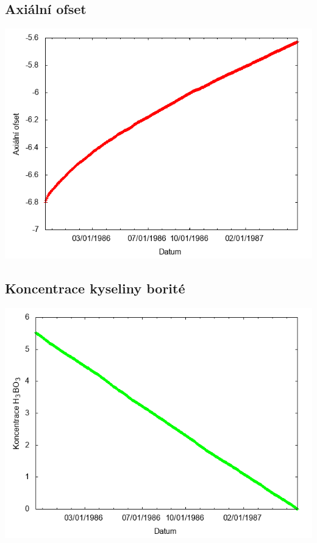 \documentclass[a4paper,twoside,11pt]{article}
\begin{document}
\subsection*{Axiální ofset}
\begin{center}
\includegraphics[width=.8\textwidth]{graphs/Atlantis_07_ao.png}
\end{center}

\subsection*{Koncentrace kyseliny borité}
\begin{center}
\includegraphics[width=.8\textwidth]{graphs/Atlantis_07_bc.png}
\end{center}
\end{document}
